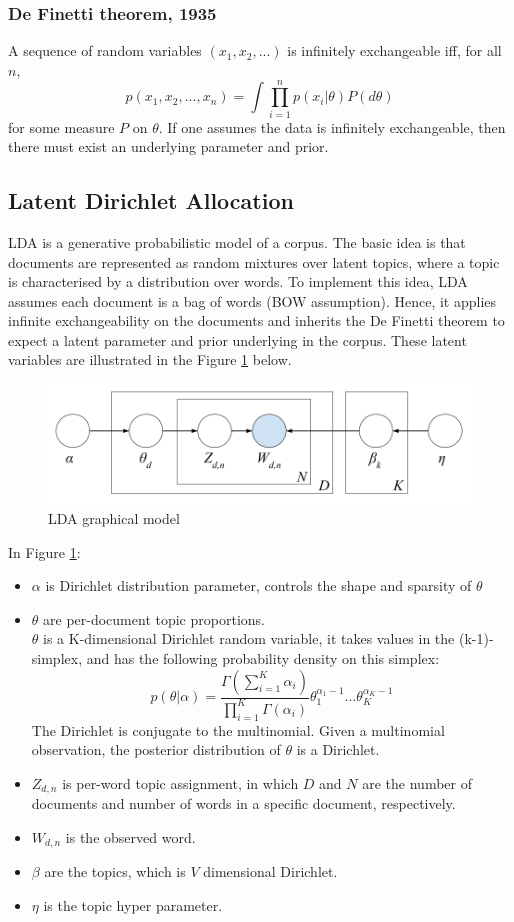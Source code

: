 \documentclass[11pt]{article}
\begin{document}
\subsubsection{De Finetti theorem, 1935}
A sequence of random variables $(x_1,x_2,...)$ is infinitely exchangeable iff, for all $n$,
\[p(x_1,x_2,...,x_n)=\int\prod_{i=1}^{n}p(x_i|\theta)P(d\theta)\]
for some measure $P$ on $\theta$.
If one assumes the data is infinitely exchangeable, then there must exist an underlying parameter and prior.

\subsection{Latent Dirichlet Allocation} \label{lda}

LDA is a generative probabilistic model of a corpus. The basic idea is that documents are represented as random mixtures over latent topics, where a topic is characterised by a distribution over words. To implement this idea, LDA assumes each document is a bag of words (BOW assumption). Hence, it applies infinite exchangeability on the documents and inherits the De Finetti theorem to expect a latent parameter and prior underlying in the corpus. These latent variables are illustrated in the Figure \ref{fig:lda_model} below.


\begin{figure}[ht]
	\centering
	\includegraphics[scale=0.3]{lda_model}
	\caption{LDA graphical model}
	\label{fig:lda_model}
\end{figure}

In Figure \ref{fig:lda_model}:
\begin{itemize}
	\item $\alpha$ is Dirichlet distribution parameter, controls the shape and sparsity of $\theta$
	\item $\theta$ are per-document topic proportions.\\
	$\theta$ is a K-dimensional Dirichlet random variable, it takes values in the (k-1)-simplex, and has the following probability density on this simplex:
	\[p(\theta|\alpha)=\frac{\Gamma(\sum_{i=1}^{K}\alpha_i)}{\prod_{i=1}^{K}\Gamma(\alpha_i)}\theta_1^{\alpha_1-1}\dots\theta_K^{\alpha_K-1}\]
	The Dirichlet is conjugate to the multinomial. Given a multinomial observation, the posterior distribution of $\theta$ is a Dirichlet.
	\item $Z_{d,n}$ is per-word topic assignment, in which $D$ and $N$ are the number of documents and number of words in a specific document, respectively.
	\item $W_{d,n}$ is the observed word.
	\item $\beta$ are the topics, which is $V$ dimensional Dirichlet.
	\item $\eta$ is the topic hyper parameter.
\end{itemize}
\end{document}
